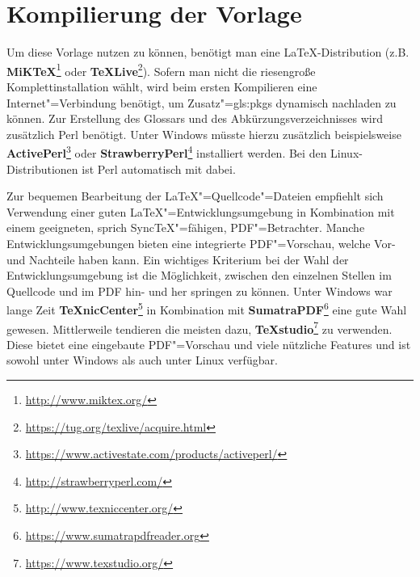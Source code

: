 \section{Kompilierung der Vorlage}%
\label{sec:Kompilierung}
%
Um diese Vorlage nutzen zu können, benötigt man eine \LaTeX-Distribution (z.B. \textbf{MiKTeX}\footnote{\url{http://www.miktex.org/}} oder \textbf{TeXLive}\footnote{\url{https://tug.org/texlive/acquire.html}}).
Sofern man nicht die riesengroße Komplettinstallation wählt, wird beim ersten Kompilieren eine Internet"=Verbindung benötigt, um Zusatz"=\glspl{gls:pkg} dynamisch nachladen zu können.
Zur Erstellung des Glossars und des Abkürzungsverzeichnisses wird zusätzlich Perl benötigt.
Unter Windows müsste hierzu zusätzlich beispielsweise \textbf{ActivePerl}\footnote{\url{https://www.activestate.com/products/activeperl/}}
oder \textbf{StrawberryPerl}\footnote{\url{http://strawberryperl.com/}} installiert werden.
Bei den Linux-Distributionen ist Perl automatisch mit dabei.

Zur bequemen Bearbeitung der \LaTeX"=Quellcode"=Dateien empfiehlt sich Verwendung einer guten \LaTeX"=Entwicklungsumgebung in Kombination mit einem geeigneten, sprich SyncTeX"=fähigen, PDF"=Betrachter.
Manche Entwicklungsumgebungen bieten eine integrierte PDF"=Vorschau, welche Vor- und Nachteile haben kann.
Ein wichtiges Kriterium bei der Wahl der Entwicklungsumgebung ist die Möglichkeit, zwischen den einzelnen Stellen im Quellcode und im PDF hin- und her springen zu können.
Unter Windows war lange Zeit \textbf{TeXnicCenter}\footnote{\url{http://www.texniccenter.org/}} in Kombination mit \textbf{SumatraPDF}\footnote{\url{https://www.sumatrapdfreader.org}} eine gute Wahl gewesen.
Mittlerweile tendieren die meisten dazu, \textbf{TeXstudio}\footnote{\url{https://www.texstudio.org/}} zu verwenden.
Diese bietet eine eingebaute PDF"=Vorschau und viele nützliche Features und ist sowohl unter Windows als auch unter Linux verfügbar.

